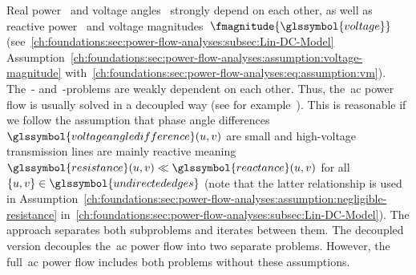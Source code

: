 Real power~ and voltage angles~
strongly depend on each other, as well as reactive
power~ and voltage
magnitudes~$\fmagnitude{\glssymbol{voltage}}$
(see~\cref{ch:foundations:sec:power-flow-analyses:subsec:Lin-DC-Model}
Assumption~\ref{ch:foundations:sec:power-flow-analyses:assumption:voltage-magnitude}
with~\cref{ch:foundations:sec:power-flow-analyses:eq:assumption:vm}).
The~\realpowers- and~\reactivepowers-\voltages problems
are weakly dependent on each other. Thus, the~\gls{ac} power flow is usually
solved in a decoupled way (see for example~\parencite{Gao18}). This is
reasonable if we follow the assumption that phase angle
differences~$\glssymbol{voltageangledifference}(\vertexa,\vertexb)$ are small
and high-voltage transmission lines are mainly reactive
meaning~$\glssymbol{resistance}
(\vertexa,\vertexb)\ll\glssymbol{reactance}(\vertexa,\vertexb)$ for all~$
\{\vertexa,\vertexb\}\in\glssymbol{undirectededges}$ (note that the latter
relationship is used in
Assumption~\ref{ch:foundations:sec:power-flow-analyses:assumption:negligible-resistance}
in~\cref{ch:foundations:sec:power-flow-analyses:subsec:Lin-DC-Model}). The
approach separates both subproblems and iterates between them. The decoupled
version decouples the~\gls{ac} power flow into two separate problems. However,
the full~\gls{ac} power flow includes both problems without these assumptions.
% 
\begin{table}[t!]
    \centering
    
    \caption[Specification of the different power grid vertex types.]{This table
    is adopted from~\parencite[p.70; Figure~4.4]{wood1996power} and specifies
    the different vertex types in a power grid. The known variables at a
    vertex~$\vertexa\in\glssymbol{vertices}$ are marked by~\textcolor{KITgreen}
    {\checkmark} and the unknowns by~\textcolor{KITred}{}. Note that
    this table is for the~\pqv formulation of an~\gls{ac} model.    %
    }
    \label{ch:foundations:tbl:load-flow-bus-specification}
\end{table}

